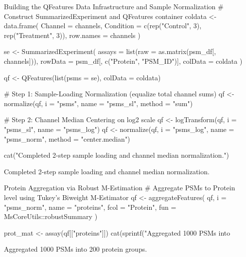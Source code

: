 \documentclass[11pt,oneside]{book}
\begin{document}
\begin{rchunk}{Building the QFeatures Data Infrastructure and Sample Normalization}
# Construct SummarizedExperiment and QFeatures container
coldata <- data.frame(
  Channel   = channels,
  Condition = c(rep("Control", 3), rep("Treatment", 3)),
  row.names = channels
)

se <- SummarizedExperiment(
  assays  = list(raw = as.matrix(psm_df[, channels])),
  rowData = psm_df[, c("Protein", "PSM_ID")],
  colData = coldata
)

qf <- QFeatures(list(psms = se), colData = coldata)

# Step 1: Sample-Loading Normalization (equalize total channel sums)
qf <- normalize(qf, i = "psms", name = "psms_sl", method = "sum")

# Step 2: Channel Median Centering on log2 scale
qf <- logTransform(qf, i = "psms_sl", name = "psms_log")
qf <- normalize(qf, i = "psms_log", name = "psms_norm", method = "center.median")

cat("Completed 2-step sample loading and channel median normalization.\n")
\end{rchunk}

\begin{routput}
Completed 2-step sample loading and channel median normalization.
\end{routput}

\begin{rchunk}{Protein Aggregation via Robust M-Estimation}
# Aggregate PSMs to Protein level using Tukey's Biweight M-Estimator
qf <- aggregateFeatures(
  qf,
  i    = "psms_norm",
  name = "proteins",
  fcol = "Protein",
  fun  = MsCoreUtils::robustSummary
)

prot_mat <- assay(qf[["proteins"]])
cat(sprintf("Aggregated 1000 PSMs into %
\end{rchunk}

\begin{routput}
Aggregated 1000 PSMs into 200 protein groups.
\end{routput}

\end{document}
